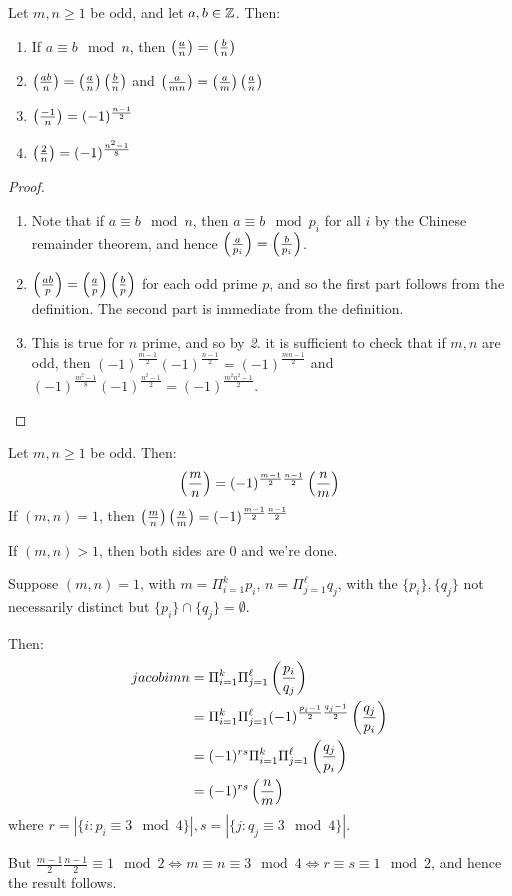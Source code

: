 \documentclass[10pt,a4paper]{article}
\begin{document}
\begin{proposition}
Let $m,n \geq 1$ be odd, and let $a,b \in \mathbb{Z}$. Then:
\begin{enumerate}
\item If $a \equiv b \mod n$, then $\left(\frac{a}{n}\right) = \left(\frac{b}{n}\right)$
\item $\left(\frac{ab}{n}\right) = \left(\frac{a}{n}\right)\left(\frac{b}{n}\right)$ and $\left(\frac{a}{mn}\right) = \left(\frac{a}{m}\right)\left(\frac{a}{n}\right)$
\item $\left(\frac{-1}{n}\right) = (-1)^{\frac{n-1}{2}}$
\item $\left(\frac{2}{n}\right) = (-1)^{\frac{n^2-1}{8}}$
\end{enumerate}
\end{proposition}
\begin{proof}\item
\begin{enumerate}
\item Note that if $a\equiv b \mod n$, then $a\equiv b\mod p_i$ for all $i$ by the Chinese remainder theorem, and hence $\left(\frac{a}{p_i}\right) = \left(\frac{b}{p_i}\right)$.
\item $\left(\frac{ab}{p}\right) = \left(\frac{a}{p}\right)\left(\frac{b}{p}\right)$ for each odd prime $p$, and so the first part follows from the definition. The second part is immediate from the definition.
\item This is true for $n$ prime, and so by \textit{2.} it is sufficient to check that if $m,n$ are odd, then $(-1)^{\frac{m-1}{2}}(-1)^{\frac{n-1}{2}} = (-1)^{\frac{mn-1}{2}}$ and $(-1)^{\frac{m^2-1}{8}}(-1)^{\frac{n^2-1}{2}}=(-1)^{\frac{m^2n^2-1}{2}}$. 
\end{enumerate}
\end{proof}

\begin{theorem}
Let $m,n \geq 1$ be odd. Then:
\begin{align*}
\left(\frac{m}{n}\right) = (-1)^{\frac{m-1}{2}\frac{n-1}{2}}\left(\frac{n}{m}\right)
\end{align*}
If $(m,n) = 1$, then $\left(\frac{m}{n}\right)\left(\frac{n}{m}\right) = (-1)^{\frac{m-1}{2}\frac{n-1}{2}}$
\end{theorem}
\begin{proposition}
If $(m,n) > 1$, then both sides are $0$ and we're done.

Suppose $(m,n) = 1$, with $m = \Pi_{i=1}^k p_i$, $n=\Pi_{j=1}^\ell q_j$, with the $\{p_i\}, \{q_j\}$ not necessarily distinct but $\{p_i\}\cap\{q_j\} = \emptyset$.

Then:
\begin{align*}
jacobi{m}{n} &= \Pi_{i=1}^k \Pi_{j=1}^\ell \left(\frac{p_i}{q_j}\right) \\
&= \Pi_{i=1}^k \Pi_{j=1}^\ell (-1)^{\frac{p_i-1}{2}\frac{q_j-1}{2}} \left(\frac{q_j}{p_i}\right) \\
&= (-1)^{rs} \Pi_{i=1}^k \Pi_{j=1}^\ell \left(\frac{q_j}{p_i}\right) \\
&= (-1)^{rs} \left(\frac{n}{m}\right)
\end{align*}
where $r = |\{i: p_i \equiv 3 \mod 4\}|, s = |\{j: q_j \equiv 3 \mod 4\}|$.

But $\frac{m-1}{2}\frac{n-1}{2}\equiv 1 \mod 2 \iff m\equiv n\equiv 3 \mod 4 \iff r\equiv s \equiv 1 \mod 2$, and hence the result follows.
\end{proposition}
\end{document}
